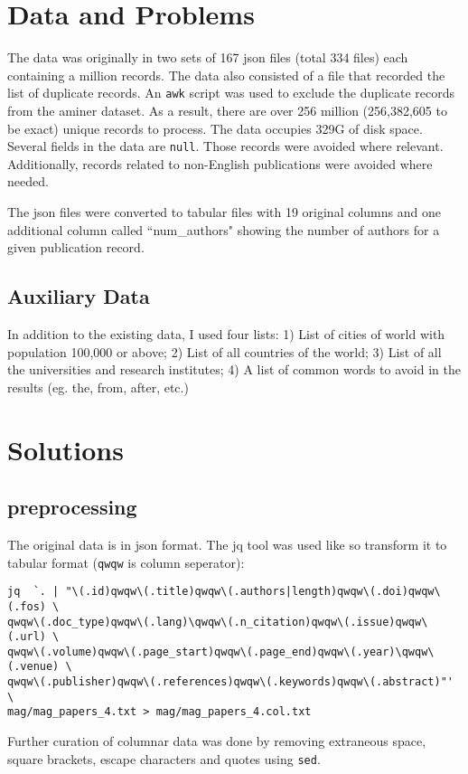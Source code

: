 \documentclass{report}
\begin{document}
\section*{Data and Problems}
The data was originally in two sets of 167 json files (total 334 files) each
containing a million records. The data also consisted of a file that recorded
the list of duplicate records. An \texttt{awk} script was used to exclude the
duplicate records from the aminer dataset. As a result, there are over 256
million (256,382,605 to be exact) unique records to process. The data occupies
329G of disk space. Several fields in the data are \texttt{null}. Those records
were avoided where relevant. Additionally, records related to non-English
publications were avoided where needed.

The json files were converted to tabular files with 19 original columns and one
additional column called ``num\_authors" showing the number of authors for a given
publication record.

\subsection*{Auxiliary Data}
In addition to the existing data, I used four lists: 1) List of cities of
world with population 100,000 or above; 2) List of all countries of the world;
3) List of all the universities and research institutes; 4) A list of common
words to avoid in the results (eg. the, from, after, etc.)

\section*{Solutions}
\subsection*{preprocessing}
The original data is in json format. The jq tool was used like so transform it to tabular format (\texttt{qwqw} is column seperator):
\begin{verbatim}
jq  `. | "\(.id)qwqw\(.title)qwqw\(.authors|length)qwqw\(.doi)qwqw\(.fos) \
qwqw\(.doc_type)qwqw\(.lang)\qwqw\(.n_citation)qwqw\(.issue)qwqw\(.url) \
qwqw\(.volume)qwqw\(.page_start)qwqw\(.page_end)qwqw\(.year)\qwqw\(.venue) \
qwqw\(.publisher)qwqw\(.references)qwqw\(.keywords)qwqw\(.abstract)"' \
mag/mag_papers_4.txt > mag/mag_papers_4.col.txt
\end{verbatim}
Further curation of columnar data was done by removing extraneous space, square brackets, escape characters and quotes using \texttt{sed}.
\end{document}
